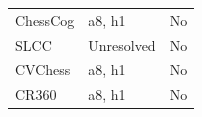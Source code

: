 \begin{longtable}{>{\raggedright\arraybackslash}p{.47\linewidth}>{\raggedright\arraybackslash}p{.25\linewidth}l}
ChessCog & %
a8, h1 & %
No \\ %

SLCC & %
Unresolved & %
No \\ %

CVChess & %
a8, h1 & %
No \\ %

CR360 & %
a8, h1 & %
No \\ %


\end{longtable}
